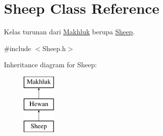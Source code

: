 \hypertarget{class_sheep}{}\section{Sheep Class Reference}
\label{class_sheep}


Kelas turunan dari \hyperlink{class_makhluk}{Makhluk} berupa \hyperlink{class_sheep}{Sheep}.  




{\ttfamily \#include $<$Sheep.\+h$>$}

Inheritance diagram for Sheep\+:\begin{figure}[H]
\begin{center}
\leavevmode
\includegraphics[height=3.000000cm]{class_sheep}
\end{center}
\end{figure}
